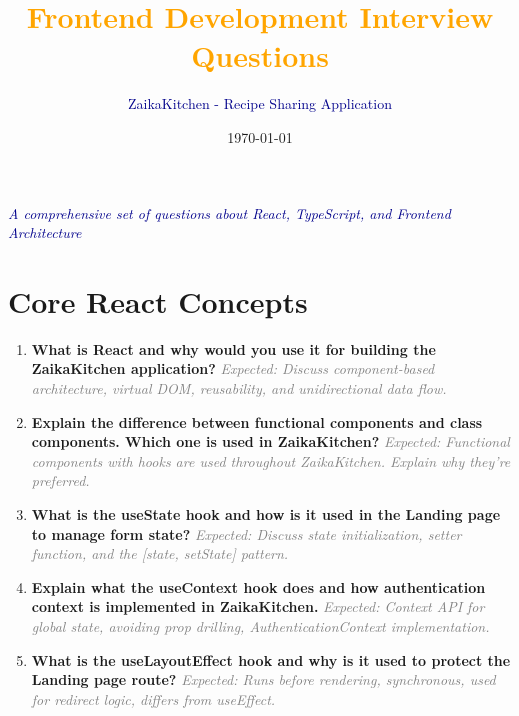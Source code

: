 \documentclass[12pt]{article}
\title{\textcolor{orange}{\textbf{Frontend Development Interview Questions}}}
\author{\textcolor{darkblue}{ZaikaKitchen - Recipe Sharing Application}}
\date{\today}
\begin{document}
\maketitle

\begin{center}
\textcolor{darkblue}{\textit{A comprehensive set of questions about React, TypeScript, and Frontend Architecture}}
\end{center}

\vspace{1cm}

\section*{Core React Concepts}

\begin{enumerate}[label=\textbf{\arabic*.}, itemsep=0.5cm]

\item \textbf{What is React and why would you use it for building the ZaikaKitchen application?}
\newline
\textcolor{gray}{\textit{Expected: Discuss component-based architecture, virtual DOM, reusability, and unidirectional data flow.}}

\item \textbf{Explain the difference between functional components and class components. Which one is used in ZaikaKitchen?}
\newline
\textcolor{gray}{\textit{Expected: Functional components with hooks are used throughout ZaikaKitchen. Explain why they're preferred.}}

\item \textbf{What is the useState hook and how is it used in the Landing page to manage form state?}
\newline
\textcolor{gray}{\textit{Expected: Discuss state initialization, setter function, and the [state, setState] pattern.}}

\item \textbf{Explain what the useContext hook does and how authentication context is implemented in ZaikaKitchen.}
\newline
\textcolor{gray}{\textit{Expected: Context API for global state, avoiding prop drilling, AuthenticationContext implementation.}}

\item \textbf{What is the useLayoutEffect hook and why is it used to protect the Landing page route?}
\newline
\textcolor{gray}{\textit{Expected: Runs before rendering, synchronous, used for redirect logic, differs from useEffect.}}

\end{enumerate}
\end{document}
